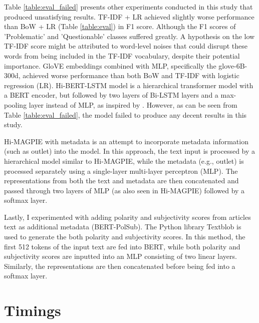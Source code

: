 Table \ref{table:eval_failed} presents other experiments conducted in this study that produced unsatisfying results. TF-IDF + LR achieved slightly worse performance than BoW + LR (Table \ref{table:eval}) in F1 score. Although the F1 scores of 'Problematic' and 'Questionable' classes suffered greatly. A hypothesis on the low TF-IDF score might be attributed to word-level noises that could disrupt these words from being included in the TF-IDF vocabulary, despite their potential importance. GloVE embeddings combined with MLP, specifically the glove-6B-300d, achieved worse performance than both BoW and TF-IDF with logistic regression (LR). Hi-BERT-LSTM model is a hierarchical transformer model with a BERT encoder, but followed by two layers of Bi-LSTM layers and a max-pooling layer instead of MLP, as inspired by \cite{khandve-2022-hierarchical-longdoc}. However, as can be seen from Table \ref{table:eval_failed}, the model failed to produce any decent results in this study.

Hi-MAGPIE with metadata is an attempt to incorporate metadata information (such as outlet) into the model. In this approach, the text input is processed by a hierarchical model similar to Hi-MAGPIE, while the metadata (e.g., outlet) is processed separately using a single-layer multi-layer perceptron (MLP). The representations from both the text and metadata are then concatenated and passed through two layers of MLP (as also seen in Hi-MAGPIE) followed by a softmax layer.

Lastly, I experimented with adding polarity and subjectivity scores from articles text as additional metadata (BERT-PolSub). The Python library Textblob \cite{loria-2018-textblob} is used to generate the both polarity and subjectivity scores. In this method, the first 512 tokens of the input text are fed into BERT, while both polarity and subjectivity scores are inputted into an MLP consisting of two linear layers. Similarly, the representations are then concatenated before being fed into a softmax layer.

\section{Timings}

